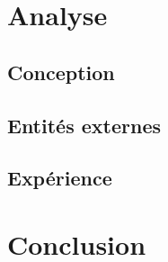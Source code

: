 \documentclass{beamer}
\begin{document}
{	\begin{frame} %
	  \par
	\end{frame}
  }
  
  {
    \section{Analyse}
    
      \begin{frame}
	\tableofcontents[hideothersubsections]
      \end{frame}
    
      \subsection{Conception}
	\begin{frame}
	 
	\end{frame}
	
      \subsection{Entités externes}
	\begin{frame}
	 
	\end{frame}
	
      \subsection{Expérience}
	\begin{frame}
	  
	\end{frame}
  }
  
  {
    \section{Conclusion}
    
      \begin{frame}
	\tableofcontents[hideothersubsections]
      \end{frame}
    
      \begin{frame}
       
      \end{frame}

  }
\end{document}
